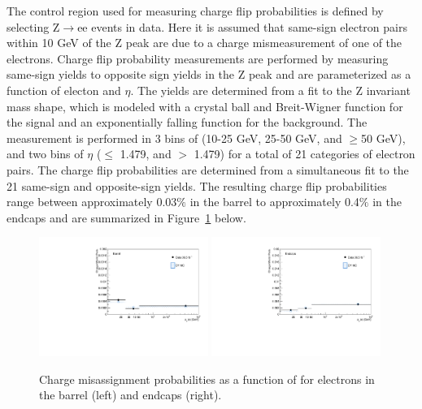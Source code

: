 The control region used for measuring charge flip probabilities is defined by selecting Z$\rightarrow$ee events in data. Here it is assumed that same-sign electron pairs within 10 GeV of the Z peak are due to a charge mismeasurement of one of
the electrons. Charge flip probability measurements are performed by measuring same-sign yields to opposite sign yields in the Z peak and are parameterized as a function of electon \pt and $\eta$.
The yields are determined from a fit to the Z invariant mass shape, which is modeled with a crystal ball and Breit-Wigner function for the signal and an exponentially falling function for the background. 
The measurement is performed in 3 bins of \pt (10-25 GeV, 25-50 GeV, and $\geq$50 GeV), and two bins of $\eta$ ($\leq$ 1.479, and $>$ 1.479) for a total of 21 categories of electron pairs.
The charge flip probabilities are determined from a simultaneous fit to the 21 same-sign and opposite-sign yields. The resulting charge flip probabilities range between approximately 0.03$\%$ in the barrel
to approximately 0.4$\%$ in the endcaps and are summarized in Figure~\ref{fig:fliprate} below.

\begin{figure}[htp]
\centering
\includegraphics[width=0.49\textwidth]{ch8_figs/chmid_prob_barrel.pdf}
\includegraphics[width=0.49\textwidth]{ch8_figs/chmid_prob_endcap.pdf}\\
\caption[Electron charge misassignment probabilities in data and MC.]{Charge misassignment probabilities as a function of \pt for electrons in the barrel (left) and endcaps (right).}
\label{fig:fliprate}
\end{figure}
 
